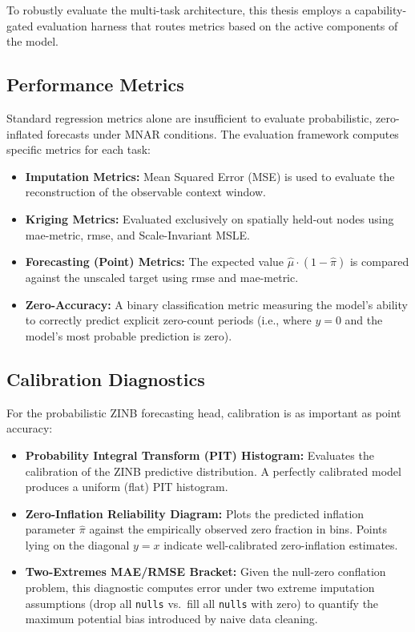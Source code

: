 To robustly evaluate the multi-task architecture, this thesis employs a capability-gated evaluation harness that routes metrics based on the active components of the model.

\subsection{Performance Metrics}
\label{subsec:meth-metrics}

Standard regression metrics alone are insufficient to evaluate probabilistic, zero-inflated forecasts under MNAR conditions. The evaluation framework computes specific metrics for each task:

\begin{itemize}
    \item \textbf{Imputation Metrics:} Mean Squared Error (MSE) is used to evaluate the reconstruction of the observable context window.
    \item \textbf{Kriging Metrics:} Evaluated exclusively on spatially held-out nodes using \gls{mae-metric}, \gls{rmse}, and Scale-Invariant MSLE.
    \item \textbf{Forecasting (Point) Metrics:} The expected value $\hat{\mu} \cdot (1 - \hat{\pi})$ is compared against the unscaled target using \gls{rmse} and \gls{mae-metric}.
    \item \textbf{Zero-Accuracy:} A binary classification metric measuring the model's ability to correctly predict explicit zero-count periods (i.e., where $y=0$ and the model's most probable prediction is zero).
\end{itemize}

\subsection{Calibration Diagnostics}
\label{subsec:meth-calibration}

For the probabilistic ZINB forecasting head, calibration is as important as point accuracy:

\begin{itemize}
    \item \textbf{Probability Integral Transform (PIT) Histogram:} Evaluates the calibration of the ZINB predictive distribution. A perfectly calibrated model produces a uniform (flat) PIT histogram.
    \item \textbf{Zero-Inflation Reliability Diagram:} Plots the predicted inflation parameter $\hat{\pi}$ against the empirically observed zero fraction in bins. Points lying on the diagonal $y=x$ indicate well-calibrated zero-inflation estimates.
    \item \textbf{Two-Extremes MAE/RMSE Bracket:} Given the null-zero conflation problem, this diagnostic computes error under two extreme imputation assumptions (drop all \texttt{nulls} vs.\ fill all \texttt{nulls} with zero) to quantify the maximum potential bias introduced by naive data cleaning.
\end{itemize}

